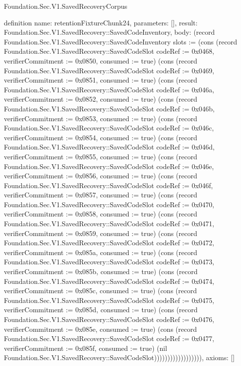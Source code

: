 \begin{lexlean}{Foundation.Sec.V1.SavedRecoveryCorpus}
\begin{semanticmodule}
definition{
  name: retentionFixtureChunk24,
  parameters: [],
  result: Foundation.Sec.V1.SavedRecovery::SavedCodeInventory,
  body: (record Foundation.Sec.V1.SavedRecovery::SavedCodeInventory {slots := (cons (record Foundation.Sec.V1.SavedRecovery::SavedCodeSlot {codeRef := 0x0468, verifierCommitment := 0x0850, consumed := true}) (cons (record Foundation.Sec.V1.SavedRecovery::SavedCodeSlot {codeRef := 0x0469, verifierCommitment := 0x0851, consumed := true}) (cons (record Foundation.Sec.V1.SavedRecovery::SavedCodeSlot {codeRef := 0x046a, verifierCommitment := 0x0852, consumed := true}) (cons (record Foundation.Sec.V1.SavedRecovery::SavedCodeSlot {codeRef := 0x046b, verifierCommitment := 0x0853, consumed := true}) (cons (record Foundation.Sec.V1.SavedRecovery::SavedCodeSlot {codeRef := 0x046c, verifierCommitment := 0x0854, consumed := true}) (cons (record Foundation.Sec.V1.SavedRecovery::SavedCodeSlot {codeRef := 0x046d, verifierCommitment := 0x0855, consumed := true}) (cons (record Foundation.Sec.V1.SavedRecovery::SavedCodeSlot {codeRef := 0x046e, verifierCommitment := 0x0856, consumed := true}) (cons (record Foundation.Sec.V1.SavedRecovery::SavedCodeSlot {codeRef := 0x046f, verifierCommitment := 0x0857, consumed := true}) (cons (record Foundation.Sec.V1.SavedRecovery::SavedCodeSlot {codeRef := 0x0470, verifierCommitment := 0x0858, consumed := true}) (cons (record Foundation.Sec.V1.SavedRecovery::SavedCodeSlot {codeRef := 0x0471, verifierCommitment := 0x0859, consumed := true}) (cons (record Foundation.Sec.V1.SavedRecovery::SavedCodeSlot {codeRef := 0x0472, verifierCommitment := 0x085a, consumed := true}) (cons (record Foundation.Sec.V1.SavedRecovery::SavedCodeSlot {codeRef := 0x0473, verifierCommitment := 0x085b, consumed := true}) (cons (record Foundation.Sec.V1.SavedRecovery::SavedCodeSlot {codeRef := 0x0474, verifierCommitment := 0x085c, consumed := true}) (cons (record Foundation.Sec.V1.SavedRecovery::SavedCodeSlot {codeRef := 0x0475, verifierCommitment := 0x085d, consumed := true}) (cons (record Foundation.Sec.V1.SavedRecovery::SavedCodeSlot {codeRef := 0x0476, verifierCommitment := 0x085e, consumed := true}) (cons (record Foundation.Sec.V1.SavedRecovery::SavedCodeSlot {codeRef := 0x0477, verifierCommitment := 0x085f, consumed := true}) (nil Foundation.Sec.V1.SavedRecovery::SavedCodeSlot)))))))))))))))))}),
  axioms: []
}


\end{semanticmodule}
\end{lexlean}
